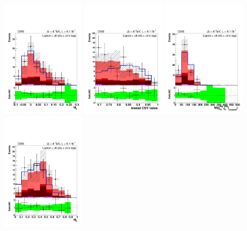 \begin{figure}[hbtp]
 \begin{center}
   \includegraphics[width=0.31\textwidth]{Figures/Analysis_1_Diagrams/d2MCPlots_h2_cut9_jge6_tge4_Combined_HtWgt.pdf}
   \includegraphics[width=0.31\textwidth]{Figures/Analysis_1_Diagrams/d2MCPlots_lowest_btag_cut9_jge6_tge4_Combined_HtWgt.pdf}
   \includegraphics[width=0.31\textwidth]{Figures/Analysis_1_Diagrams/d2MCPlots_closest_tagged_dijet_mass_cut9_jge6_tge4_Combined_HtWgt.pdf}
   \includegraphics[width=0.31\textwidth]{Figures/Analysis_1_Diagrams/d2MCPlots_h3_cut9_jge6_tge4_Combined_HtWgt.pdf}

\end{center}
\end{figure}
